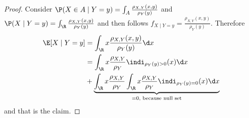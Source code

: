\subsection{}
\begin{proof}
	Consider $\P(X \in A \mid Y=y) = \int_A \frac{\rho_{X,Y}(x,y)}{\rho_Y(y)}$ and $\P(X \mid Y = y) = \int_{\R} \frac{\rho_{X,Y}(x,y)}{\rho_Y(y)}$ and then follows $f_{X\mid Y=y} = \frac{\rho_{X,Y}(x,y)}{\rho_Y(y)}$. Therefore
	\begin{align*}
		\E[X \mid Y=y] &= \int_{\R} x \frac{\rho_{X,Y}(x,y)}{\rho_Y(y)} \d x\\
		&= \int_{\R} x \frac{\rho_{X,Y}}{\rho_Y}\indi_{\rho_Y(y) >0} (x) \d x \\
		&+ \underbrace{\int_{\R} x \frac{\rho_{X,Y}}{\rho_Y} \int_{\R} x \frac{\rho_{X,Y}}{\rho_Y} \indi_{\rho_Y(y) =0} (x) \d x}_{=0, \text{ because null set}}
	\end{align*}
	and that is the claim.
\end{proof}

%	
